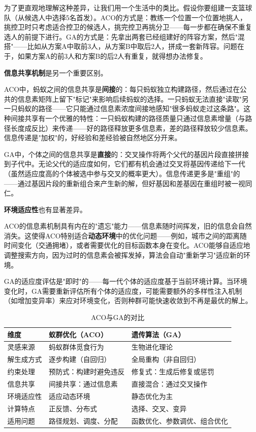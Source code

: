 \documentclass[lang=cn,zihao=-4,a4paper,fontset=windows]{beautybook}
\begin{document}
为了更直观地理解这种差异，让我们用一个生活中的类比。假设你要组建一支篮球队（从候选人中选择5名首发）。ACO的方式是：教练一个位置一个位置地挑人，挑控卫时只考虑适合控卫的候选人，挑完控卫再挑分卫——每一步都在确保不重复选人的前提下进行。GA的方式是：先拿出两套已经组建好的阵容方案，然后"混搭"——比如从方案A中取前3人，从方案B中取后2人，拼成一套新阵容。问题在于，如果方案A的前3人和方案B的后2人有重复，就得想办法修复。

\textbf{信息共享机制}是另一个重要区别。

ACO中，蚂蚁之间的信息共享是\textbf{间接}的：每只蚂蚁独立构建路径，然后通过在公共的信息素矩阵上留下"标记"来影响后续蚂蚁的选择。一只蚂蚁无法直接"读取"另一只蚂蚁的路径——它只能通过信息素浓度间接地感知"很多蚂蚁走过这条路"。这种间接共享有一个优雅的特性：一只蚂蚁构建的路径质量只通过信息素增量（与路径长度成反比）来传递——好的路径释放更多信息素，差的路径释放较少信息素。信息传递是"加权"的，好经验和差经验被自然地区分开来。

GA中，个体之间的信息共享是\textbf{直接}的：交叉操作将两个父代的基因片段直接拼接到子代中。无论父代的适应度如何，它们都有机会通过交叉将基因传递给下一代（虽然适应度高的个体被选中参与交叉的概率更大）。信息传递更多是"重组"的——通过基因片段的重新组合来产生新的解，但好基因和差基因在重组时被一视同仁。

\textbf{环境适应性}也有显著差异。

ACO的信息素机制具有内在的"遗忘"能力——信息素随时间挥发，旧的信息会自然消失。这使得ACO特别适合\textbf{动态环境}中的优化问题——例如，城市之间的距离随时间变化（交通拥堵），或者需要优化的目标函数本身在变化。ACO能够自适应地调整搜索方向，因为过时的信息素会被挥发掉，算法会自动"重新学习"适应新的环境。

GA的适应度评估是"即时"的——每一代个体的适应度基于当前环境计算。当环境变化时，GA需要重新评估所有个体的适应度，可能需要额外的多样性注入机制（如增加变异率）来应对环境变化，否则种群可能快速收敛到不再是最优的解上。

\begin{table}[H]
\centering
\caption{ACO与GA的对比}
\begin{tabular}{p{}p{}p{}}
\toprule
\textbf{维度} & \textbf{蚁群优化（ACO）} & \textbf{遗传算法（GA）} \\
\midrule
灵感来源 & 蚂蚁群体觅食行为 & 生物进化理论 \\
\hline
解生成方式 & 逐步构建（自回归） & 全局重构（非自回归） \\
\hline
约束处理 & 预防式：构建时避免违反 & 修复式：生成后修复或惩罚 \\
\hline
信息共享 & 间接共享：通过信息素 & 直接混合：通过交叉操作 \\
\hline
环境适应性 & 适应动态环境 & 静态优化为主 \\
\hline
计算特点 & 正反馈、分布式 & 选择、交叉、变异 \\
\hline
适用问题 & 路径规划、调度、分配 & 函数优化、参数调优、组合优化 \\
\bottomrule
\end{tabular}
\end{table}
\end{document}
